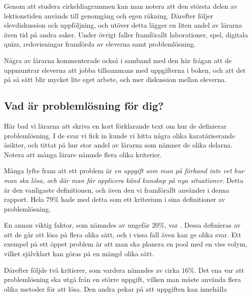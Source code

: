 \textcolor{lila}{Genom att studera cirkeldiagrammen kan man notera att den största delen av lektionstiden används till genomgång och egen räkning. Därefter följer elevdiskussion och uppföljning, och utöver detta lägger en liten andel av lärarna även tid på andra saker. Under övrigt faller framförallt laborationer, spel, digitala quizz, redovisningar framförda av eleverna samt problemlösning.}

\textcolor{lila}{Några av lärarna kommenterade också i samband med den här frågan att de uppmuntrar eleverna att jobba tillsammans med uppgifterna i boken, och att det på så sätt blir mycket lite eget arbete, och mer diskussion mellan eleverna.}

\subsection{Vad är problemlösning för dig?}
\textcolor{lila}{Här bad vi lärarna att skriva en kort förklarande text om hur de definierar problemlösning. I de svar vi fick in kunde vi hitta några olika karatäriserande åsikter, och tittat på hur stor andel av lärarna som nämner de olika delarna. Notera att många lärare nämnde flera olika kriterier.}

\textcolor{lila}{Många lyfte fram att ett problem är \textsl{en uppgift som man på förhand inte vet hur man ska lösa, och där man får applicera känd kunskap på nya situationer}. Detta är den vanligaste definitionen, och även den vi framförallt använder i denna rapport. Hela $79\%$ hade med detta som ett kriterium i sina definitioner av problemlösning.}

\textcolor{lila}{En annan viktig faktor, som nämndes av ungefär $20\%$, var . Dessa definieras av att de går att lösa på flera olika sätt, och i vissa fall även kan ge olika svar. Ett exempel på ett öppet problem är att man ska planera en pool med en viss volym, vilket självklart kan göras på en mängd olika sätt.}

\textcolor{lila}{Därefter följde två kritierer, som vardera nämndes av cirka $16\%$. Det ena var att problemlösning ska utgå från en större uppgift, vilken man måste använda flera olika metoder för att lösa. Den andra pekar på att uppgiften kan innehålla }